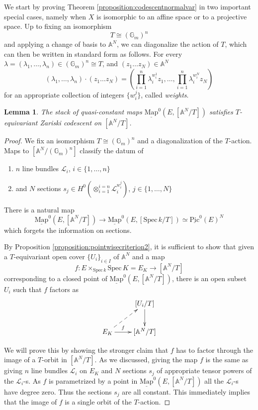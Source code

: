 \documentclass[11pt,letterpaper]{amsart}
\newtheorem{lemma}[dummy]{Lemma}
\newcommand{\bA}{\mathbb{A}}
\newcommand{\bG}{\mathbb{G}}
\newcommand{\cL}{\mathcal{L}}
\newcommand{\Mapo}[2]{\underline{\mathrm{Map}}^{0}\left (#1,#2\right )}
\newcommand{\Spec}{\mathrm{S}\mathrm{pec}\,}
\newcommand{\Pic}{\underline{\mathrm{Pic}}}
\begin{document}
    We start by proving Theorem \ref{proposition:codescentnormalvar}  in two important special cases, namely when $X$ is isomorphic to an affine space or to a projective space.  Up to fixing an isomorphism $$T \cong (\mathbb{G}_m)^n$$ and applying a change of basis to $\bA^N$, we can diagonalize the  action of $T$, which can then be written in standard form as follows.   
  For every   $\lambda = 
    (\lambda_1, \ldots, \lambda_n) \in (\mathbb{G}_m)^n \cong T$,  and 
    $(z_1 \ldots z_N)  \in \bA^N$
    $$  
(\lambda_1, \ldots, \lambda_n) \cdot (z_1 \ldots z_N) =    (\prod_{i=1}^{n}\lambda_i^{w^1_i}z_1,\dots,\prod_{i=1}^{n}\lambda_i^{w^N_i}z_N)   
    $$     
for an appropriate collection of integers  $\{ w_i^j \}$, called \emph{weights}.
	\begin{lemma}
    \label{lemma:Ancodescent}
The stack of quasi-constant maps $\Mapo{E}{[\mathbb{A}^N/T]}$ satisfies $T$-equivariant Zariski codescent on $[\mathbb{A}^N/T]$. 
\end{lemma}
\begin{proof}
We fix an isomorphism $T \cong (\mathbb{G}_m)^n$ and a diagonalization of the $T$-action. Maps to $[\bA^N/(\bG_m)^n]$ classify the datum of 
\begin{enumerate}
\item  $n$ line bundles $\cL_i$, $i \in \{1, \ldots, n \}$
\item and $N$ sections $s_j \in H^0(\otimes_{i=1}^{i=n}\cL_i^{w^j_i})$, $j \in \{1, \ldots, N\}$ 
\end{enumerate} 
There is a natural map 
$$
 \Mapo{E}{[\bA^N/T]} 
 \to \Mapo{E}{[\Spec k/T]} \simeq \Pic^0(E)^N 
$$
which forgets the information on sections. 

By Proposition \ref{proposition:pointwisecriterion2}, it is sufficient to show  that given a $T$-equivariant open cover $\{U_i\}_{i \in I}$ of $\mathbb{A}^N$ and 
a map
$$
f: E \times_{\Spec k}\Spec K = E_K \to [\mathbb{A}^N/T]
$$
corresponding to a closed point of $\Mapo{E}{[\bA^N/T]}$, there is an open subset $U_i$ such that $f$ factors as 
$$
\xymatrix{
& [U_i/T] \ar[d] \\
E_K \ar@{-->}[ur] \ar[r]^-f & [\bA^N/T]}
$$

We will prove this by showing the stronger claim that $f$ has to factor through the image of a $T$-orbit in $[\bA^N/T]$. 
As we discussed, giving the map $f$ is the same as giving $n$ line bundles $\cL_i$ on $E_K$ and $N$ sections $s_j$ of appropriate tensor powers of the $\cL_i$-s. As $f$ is parametrized by a point in $\Mapo{E}{[\bA^N/T]}$ all the $\cL_i$-s have degree zero. Thus the sections $s_j$ are all constant. This immediately implies that the image of $f$ is a single orbit of the $T$-action. 
\end{proof}
\end{document}
